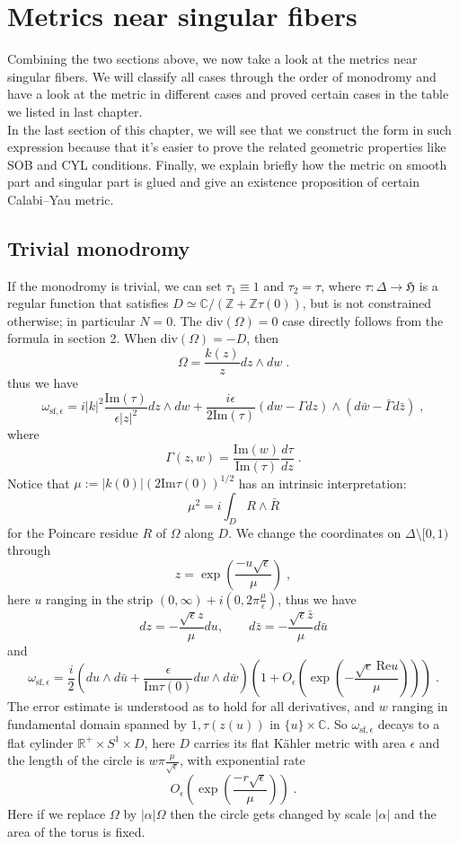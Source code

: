 
\chapter{Metrics near singular fibers}
Combining the two sections above, we now take a look at the metrics near singular fibers. We will classify all cases through the order of monodromy and have a look at the metric in different cases and proved certain cases in the table we listed in last chapter.\\ \indent
In the last section of this chapter, we will see that we construct the form in such expression because that it's easier to prove the related geometric properties like SOB and CYL conditions. Finally, we explain briefly how the metric on smooth part and singular part is glued and give an existence proposition of certain Calabi--Yau metric.
\section{Trivial monodromy}
\indent If the monodromy is trivial, we can set $\tau_1\equiv 1$ and $\tau_2=\tau$, where $\tau\colon\Delta\rightarrow\mathfrak{H}$ is a regular function that satisfies $D\simeq \mathbb{C}/(\mathbb{Z}+\mathbb{Z}\tau(0))$, but is not constrained otherwise; in particular $N=0$. The div$(\Omega)=0$ case directly follows from the formula in section 2. When div$(\Omega)=-D$, then $$\Omega=\frac{k(z)}{z}dz\wedge dw\; .$$
thus we have
$$\omega_{\textrm{sf},\epsilon}=i|k|^2\frac{\textrm{Im}(\tau)}{\epsilon|z|^2}dz\wedge dw+\frac{i\epsilon}{2\textrm{Im}(\tau)}(dw-\Gamma dz)\wedge(d\bar{w}-\bar{\Gamma}d\bar{z})\; ,$$
where $$\Gamma(z,w)=\frac{\textrm{Im}(w)}{\textrm{Im}(\tau)}\frac{d\tau}{dz}\; .$$
\indent Notice that $\mu:=|k(0)|(2\textrm{Im}\tau(0))^{1/2}$ has an intrinsic interpretation:
$$\mu^2=i\int_D R\wedge\bar{R}$$
for the Poincare residue $R$ of $\Omega$ along $D$. We change the coordinates on $\Delta\setminus[0,1)$ through
$$z=\exp\left(\frac{-u\sqrt{\epsilon}}{\mu}\right)\; ,$$
here $u$ ranging in the strip $(0,\infty)+i(0,2\pi\frac{\mu}{\epsilon})$, thus we have
$$dz=-\frac{\sqrt{\epsilon}z}{\mu}du,\qquad d\bar{z}=-\frac{\sqrt{\epsilon}\bar{z}}{\mu}d\bar{u}$$
and
$$\omega_{\textrm{sf},\epsilon}=\frac{i}{2}\left(du\wedge d\bar{u}+\frac{\epsilon}{\textrm{Im}\tau(0)}dw\wedge d\bar{w}\right)\left(1+O_\epsilon\left(\exp\left(-\frac{\sqrt{\epsilon}\:\textrm{Re}u}{\mu} \right)\right)\right)\; .$$
\indent The error estimate is understood as to hold for all derivatives, and $w$ ranging in fundamental domain spanned by $1,\tau(z(u))$ in $\{u\}\times\mathbb{C}$. So $\omega_{\textrm{sf},\epsilon}$ decays to a flat cylinder $\mathbb{R}^+\times S^1\times D$, here $D$ carries its flat K{\"a}hler metric with area $\epsilon$ and the length of the circle is $w\pi\frac{\mu}{\sqrt{\epsilon}}$, with exponential rate $$O_\epsilon\left(\exp\left(\frac{-r\sqrt{\epsilon}}{\mu}\right)\right)\; .$$
\indent Here if we replace $\Omega$ by $|\alpha|\Omega$ then the circle gets changed by scale $|\alpha|$ and the area of the torus is fixed.\\ \indent
